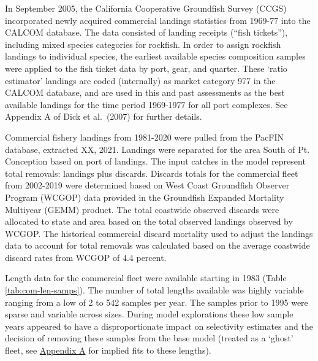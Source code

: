 \documentclass[11pt,
  english,
  a4paper,
]{article}
\begin{document}
\leavevmode\tagmcend\tagstructend\par


In September 2005, the California Cooperative Groundfish Survey (CCGS) incorporated newly acquired commercial landings statistics from 1969-77 into the CALCOM database. The data consisted of landing receipts (``fish tickets''), including mixed species categories for rockfish. In order to assign rockfish landings to individual species, the earliest available species composition samples were applied to the fish ticket data by port, gear, and quarter. These `ratio estimator' landings are coded (internally) as market category 977 in the CALCOM database, and are used in this and past assessments as the best available landings for the time period 1969-1977 for all port complexes. See Appendix A of Dick et al.~{(2007)\leavevmode\tagmcend\tagstructend} for further details.

\leavevmode\tagmcend\tagstructend\par


Commercial fishery landings from 1981-2020 were pulled from the PacFIN database, extracted XX, 2021. Landings were separated for the area South of Pt. Conception based on port of landings. The input catches in the model represent total removals: landings plus discards. Discards totals for the commercial fleet from 2002-2019 were determined based on West Coast Groundfish Observer Program (WCGOP) data provided in the Groundfish Expanded Mortality Multiyear (GEMM) product. The total coastwide observed discards were allocated to state and area based on the total observed landings observed by WCGOP. The historical commercial discard mortality used to adjust the landings data to account for total removals was calculated based on the average coastwide discard rates from WCGOP of 4.4 percent.

\leavevmode\tagmcend\tagstructend\par


Length data for the commercial fleet were available starting in 1983 (Table \ref{tab:com-len-samps}). The number of total lengths available was highly variable ranging from a low of 2 to 542 samples per year. The samples prior to 1995 were sparse and variable across sizes. During model explorations these low sample years appeared to have a disproportionate impact on selectivity estimates and the decision of removing these samples from the base model (treated as a `ghost' fleet, see {\protect\hyperlink{append_a}{Appendix A}\leavevmode\tagmcend\tagstructend} for implied fits to these lengths).
\end{document}
